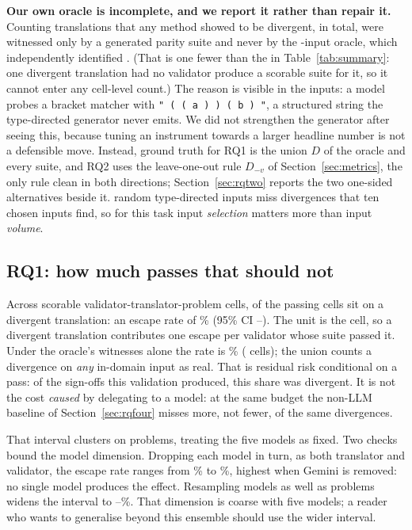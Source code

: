 \documentclass[sigconf]{acmart}
\begin{document}
\textbf{Our own oracle is incomplete, and we report it rather than repair it.} Counting
translations that any method showed to be divergent, \DivTransUnion{} in total,
\OnlySuiteFound{} were witnessed only by a generated parity suite and never by the
\NFuzz{}-input oracle, which independently identified \DivTransOracle{}. (That is one fewer than
the \NDivergent{} in Table~\ref{tab:summary}: one divergent translation had no validator produce
a scorable suite for it, so it cannot enter any cell-level count.) The reason is visible in the inputs: a model probes a bracket matcher with
\texttt{"~(~(~a~)~)~(~b~)~"}, a structured string the type-directed generator never emits. We did
not strengthen the generator after seeing this, because tuning an instrument towards a larger
headline number is not a defensible move. Instead, ground truth for RQ1 is the union $D$ of the
oracle and every suite, and RQ2 uses the leave-one-out rule $D_{-v}$ of
Section~\ref{sec:metrics}, the only rule clean in both directions;
Section~\ref{sec:rqtwo} reports the two one-sided alternatives beside it. \NFuzz{} random
type-directed inputs miss divergences that ten chosen inputs find, so for this task input
\emph{selection} matters more than input \emph{volume}.

\subsection{RQ1: how much passes that should not}
\label{sec:rqone}

Across \NCells{} scorable validator-translator-problem cells, \NEscaped{} of the \NPassed{}
passing cells sit on a divergent translation: an escape rate of \EscapeRate\%
(95\% CI \EscapeLo--\EscapeHi). The unit is the cell, so a divergent translation contributes
one escape per validator whose suite passed it. Under the oracle's witnesses alone the rate is
\EscapeOracleOnly\% (\NEscapedOracleOnly{} cells); the union counts a divergence on \emph{any}
in-domain input as real. That is residual risk conditional on a pass: of the sign-offs this validation produced, this
share was divergent. It is not the cost \emph{caused} by delegating to a model: at the same budget the
non-LLM baseline of Section~\ref{sec:rqfour} misses more, not fewer, of the same divergences.

That interval clusters on problems, treating the five models as fixed. Two checks bound the
model dimension. Dropping each model
in turn, as both translator and validator, the escape rate ranges from \JackLo\% to \JackHi\%,
highest when Gemini is removed: no single model produces the effect. Resampling models as well
as problems widens the interval to \EscapeTwoLo--\EscapeTwoHi\%. That dimension is coarse with
five models; a reader who wants to generalise beyond this ensemble should use the wider
interval.
\end{document}
